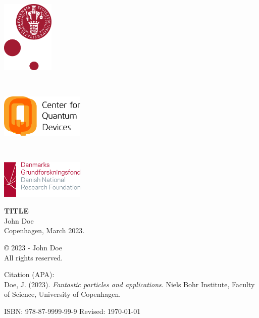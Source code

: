 \documentclass[../main]{subfiles}
\begin{document}
\begin{titlingpage}
\noindent
\begin{minipage}{.20\textwidth}
\includegraphics[width=2.5cm,keepaspectratio]{img/ku_logo_with_dots.pdf}\\
\vspace*{0.5cm}
\end{minipage}~\hspace{.1\textwidth}~%
\begin{minipage}{.30\textwidth}
\includegraphics[width=4cm,keepaspectratio]{frontmatter/img/Qdevlogotxtright.pdf}\\
\vspace*{2cm}
\end{minipage}~\hspace{.1\textwidth}~%
\begin{minipage}{.30\textwidth}
\includegraphics[width=4cm,keepaspectratio]{frontmatter/img/dg.png}\\
\vspace*{2cm}
\end{minipage}


\vspace*{2cm}

\noindent  \textbf{TITLE}\\
John Doe \\
Copenhagen, March 2023.

\vspace{2cm}
\noindent © 2023 - John Doe \\
All rights reserved.

\vspace{2cm}
\noindent Citation (APA):\\
\small
Doe, J. (2023). \textit{Fantastic particles and applications}. Niels Bohr
Institute, Faculty of Science, University of Copenhagen.

\vfill
\noindent \textsc{ISBN}: 978-87-9999-99-9 \newline
\noindent
Revised: \today
\clearpage

\end{titlingpage}
\end{document}
